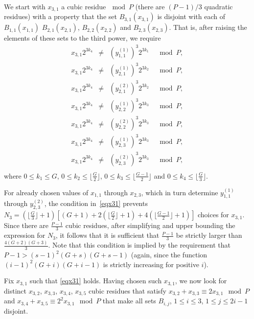 We start with $x_{3,1}$ a cubic residue$~\mod P$ (there are
$(P-1)/3$ quadratic residues) with a property that the set
$B_{3,1}(x_{3,1})$ is disjoint with each of $B_{1,1}(x_{1,1})$
$B_{2,1}(x_{2,1})$, $B_{2,2}(x_{2,2})$ and $B_{2,3}(x_{2,3})$.
That is, after raising the elements of these sets to the third
power, we require
\begin{equation}\label{eqx31}\begin{array}{cccc}
x_{3,1}2^{3k_4} &\neq& (y_{1,1}^{(1)})^3 2^{3k_1} &\mod P, \\
x_{3,1}2^{3k_4} &\neq& (y_{2,1}^{(1)})^3 2^{3k_2} &\mod P, \\
x_{3,1}2^{3k_4} &\neq& (y_{2,1}^{(2)})^3 2^{3k_2} &\mod P, \\
x_{3,1}2^{3k_4} &\neq& (y_{2,2}^{(1)})^3 2^{3k_3} &\mod P, \\
x_{3,1}2^{3k_4} &\neq& (y_{2,2}^{(2)})^3 2^{3k_3} &\mod P, \\
x_{3,1}2^{3k_4} &\neq& (y_{2,3}^{(1)})^3 2^{3k_3} &\mod P, \\
x_{3,1}2^{3k_4} &\neq& (y_{2,3}^{(2)})^3 2^{3k_3} &\mod P, \\
\end{array}\end{equation}
where $0 \leq k_1 \leq G$, $0 \leq k_2 \leq \lfloor \frac{G}{2}
\rfloor$, $0 \leq k_3 \leq \lfloor\frac{G-1}{2} \rfloor$ and $0
\leq k_4 \leq \lfloor\frac{G}{3} \rfloor$.

For already chosen values of $x_{1,1}$ through $x_{2,3}$, which in
turn determine $y_{1,1}^{(1)}$ through $y_{2,3}^{(2)}$, the
condition in~\eqref{eqx31} prevents $N_3= \left(\lfloor
\frac{G}{3} \rfloor +1 \right)\left[ (G+1)+2\left(\lfloor
\frac{G}{2} \rfloor +1 \right) +4\left(\lfloor \frac{G-1}{2}
\rfloor +1 \right)\right]$ choices for $x_{3,1}$. Since there are
$\frac{P-1}{3}$ cubic residues, after simplifying and upper
bounding the expression for $N_3$, it follows that it is
sufficient that $\frac{P-1}{3}$ be strictly larger than
$\frac{4(G+2)(G+3)}{3}$. Note that this condition is implied by
the requirement that $P-1> (s-1)^2(G+s)(G+s-1)$ (again, since the
function $(i-1)^2(G+i)(G+i-1)$ is strictly increasing for positive
$i$).

Fix $x_{3,1}$ such that \eqref{eqx31} holds. Having chosen such
$x_{3,1}$, we now look for distinct $x_{3,2}$, $x_{3,3}$,
$x_{3,4}$, $x_{3,5}$ cubic residues that satisfy $x_{3,2}+x_{3,3}
\equiv 2x_{3,1} \mod P$ and $x_{3,4}+x_{3,5} \equiv 2^2x_{3,1}
\mod P$ that make all sets $B_{i,j}$, $1 \leq i \leq 3$, $1 \leq j
\leq 2i-1$ disjoint.


